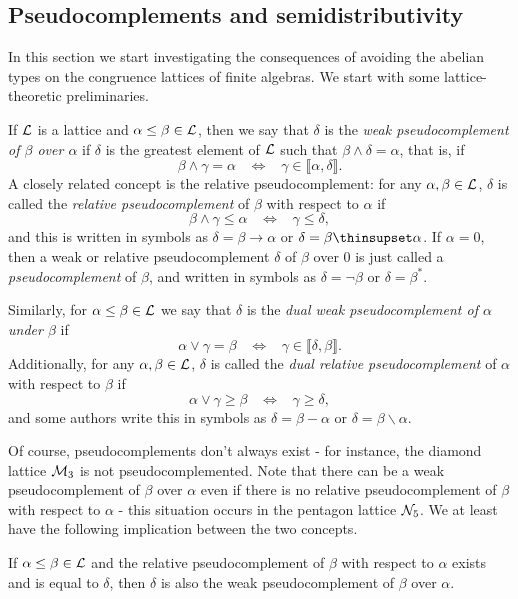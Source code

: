 \begin{appendices}
\section{Pseudocomplements and semidistributivity}

In this section we start investigating the consequences of avoiding the abelian types on the congruence lattices of finite algebras. We start with some lattice-theoretic preliminaries.

\begin{defn} If $\mathcal{L}$ is a lattice and $\alpha \le \beta \in \mathcal{L}$, then we say that $\delta$ is the \emph{weak pseudocomplement of $\beta$ over $\alpha$} if $\delta$ is the greatest element of $\mathcal{L}$ such that $\beta \wedge \delta = \alpha$, that is, if
\[
\beta \wedge \gamma = \alpha \;\;\; \iff \;\;\; \gamma \in \llbracket \alpha, \delta \rrbracket.
\]
A closely related concept is the relative pseudocomplement: for any $\alpha, \beta \in \mathcal{L}$, $\delta$ is called the \emph{relative pseudocomplement} of $\beta$ with respect to $\alpha$ if
\[
\beta \wedge \gamma \le \alpha \;\;\; \iff \;\;\; \gamma \le \delta,
\]
and this is written in symbols as $\delta = \beta \to \alpha$ or $\delta = \beta \thinsupset \alpha$. If $\alpha = 0$, then a weak or relative pseudocomplement $\delta$ of $\beta$ over $0$ is just called a \emph{pseudocomplement} of $\beta$, and written in symbols as $\delta = \neg \beta$ or $\delta = \beta^*$.

Similarly, for $\alpha \le \beta \in \mathcal{L}$ we say that $\delta$ is the \emph{dual weak pseudocomplement of $\alpha$ under $\beta$} if
\[
\alpha \vee \gamma = \beta \;\;\; \iff \;\;\; \gamma \in \llbracket \delta, \beta \rrbracket.
\]
Additionally, for any $\alpha, \beta \in \mathcal{L}$, $\delta$ is called the \emph{dual relative pseudocomplement} of $\alpha$ with respect to $\beta$ if
\[
\alpha \vee \gamma \ge \beta \;\;\; \iff \;\;\; \gamma \ge \delta,
\]
and some authors write this in symbols as $\delta = \beta - \alpha$ or $\delta = \beta \backslash \alpha$.
\end{defn}

Of course, pseudocomplements don't always exist - for instance, the diamond lattice $\mathcal{M}_3$ is not pseudocomplemented. Note that there can be a weak pseudocomplement of $\beta$ over $\alpha$ even if there is no relative pseudocomplement of $\beta$ with respect to $\alpha$ - this situation occurs in the pentagon lattice $\mathcal{N}_5$. We at least have the following implication between the two concepts.

\begin{prop} If $\alpha \le \beta \in \mathcal{L}$ and the relative pseudocomplement of $\beta$ with respect to $\alpha$ exists and is equal to $\delta$, then $\delta$ is also the weak pseudocomplement of $\beta$ over $\alpha$.
\end{prop}


\end{appendices}
